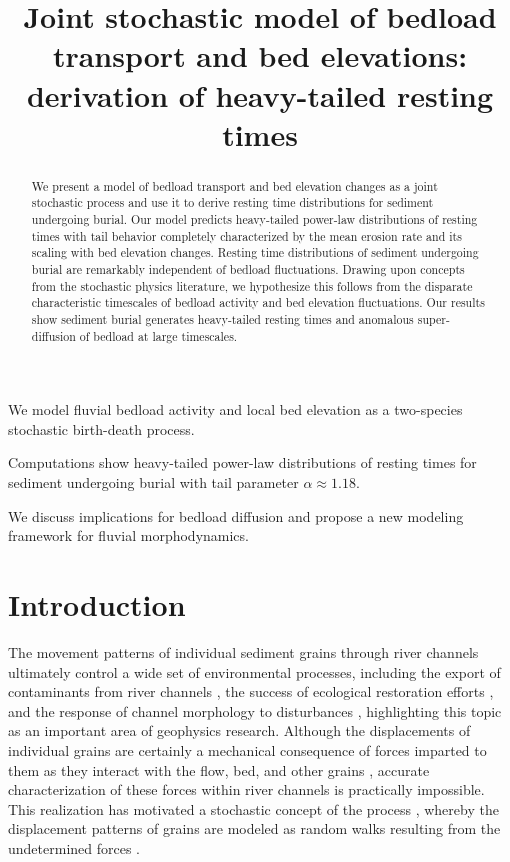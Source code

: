 \documentclass[draft]{agujournal2018}
\begin{document}
\title{Joint stochastic model of bedload transport and bed elevations: derivation of heavy-tailed resting times}

\begin{keypoints}
\item We model fluvial bedload activity and local bed elevation as a two-species stochastic birth-death process.
\item Computations show heavy-tailed power-law distributions of resting times for sediment undergoing burial with tail parameter $\alpha\approx 1.18$.
\item We discuss implications for bedload diffusion and propose a new modeling framework for fluvial morphodynamics.

\end{keypoints}

\begin{abstract}
We present a model of bedload transport and bed elevation changes as a joint stochastic process and use it to derive resting time distributions for sediment undergoing burial.
Our model predicts heavy-tailed power-law distributions of resting times with tail behavior completely characterized by the mean erosion rate and its scaling with bed elevation changes.
Resting time distributions of sediment undergoing burial are remarkably independent of bedload fluctuations.
Drawing upon concepts from the stochastic physics literature, we hypothesize this follows from the disparate characteristic timescales of bedload activity and bed elevation fluctuations.
Our results show sediment burial generates heavy-tailed resting times and anomalous super-diffusion of bedload at large timescales.
\end{abstract} 

\section{Introduction}

The movement patterns of individual sediment grains through river channels ultimately control a wide set of environmental processes, including the export of contaminants from river channels \citep[e.g.][]{Malmon2005,Macklin2006}, the success of ecological restoration efforts \citep[e.g.][]{Gaeuman2017}, and the response of channel morphology to disturbances \citep[e.g.][]{Hassan2017}, highlighting this topic as an important area of geophysics research.
Although the displacements of individual grains are certainly a mechanical consequence of forces imparted to them as they interact with the flow, bed, and other grains \citep[e.g.][]{Wiberg1985, Vowinckel2014}, accurate characterization of these forces within river channels is practically impossible.
This realization has motivated a stochastic concept of the process \citep[e.g.][]{Einstein1937}, whereby the displacement patterns of grains are modeled as random walks resulting from the undetermined forces \citep[e.g.][]{Weiss1994}.
\end{document}
